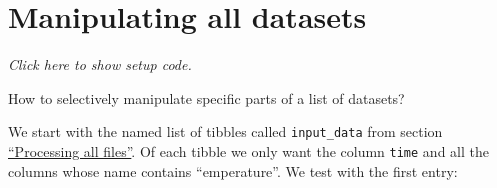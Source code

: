 \documentclass[]{book}
\newenvironment{Shaded}{\begin{snugshade}}{\end{snugshade}}
\newcommand{\DecValTok}[1]{\textcolor[rgb]{0.00,0.00,0.81}{#1}}
\newcommand{\KeywordTok}[1]{\textcolor[rgb]{0.13,0.29,0.53}{\textbf{#1}}}
\newcommand{\NormalTok}[1]{#1}
\newcommand{\OperatorTok}[1]{\textcolor[rgb]{0.81,0.36,0.00}{\textbf{#1}}}
\newcommand{\StringTok}[1]{\textcolor[rgb]{0.31,0.60,0.02}{#1}}
\begin{document}
\begin{enumerate}
\begin{Shaded}
\end{Shaded}
\end{enumerate}

\hypertarget{map_manip}{%
\section{Manipulating all datasets}\label{map_manip}}

\emph{Click here to show setup code.}

\begin{Shaded}
\end{Shaded}

How to selectively manipulate specific parts of a list of datasets?

We start with the named list of tibbles called \texttt{input\_data} from section \protect\hyperlink{map}{``Processing all files''}.
Of each tibble we only want the column \texttt{time} and all the columns whose name contains ``emperature''.
We test with the first entry:

\begin{Shaded}
\end{Shaded}
\end{document}
